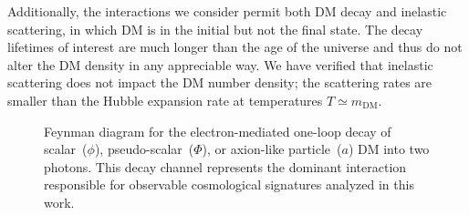 \documentclass[aps,prd,twocolumn,showpacs,superscriptaddress,nofootinbib,preprintnumbers]{revtex4-2}
\begin{document}
Additionally, the interactions we consider permit both DM decay and inelastic scattering, in which DM is in the initial but not the final state.
The decay lifetimes of interest are much longer than the age of the universe and thus do not alter the DM density in any appreciable way.
We have verified that inelastic scattering does not impact the DM number density; the scattering rates are smaller than the Hubble expansion rate at temperatures $T \simeq m_\mathrm{DM}$.

\begin{figure}[ht!]
  \centering
  \caption{Feynman diagram for the electron-mediated one-loop decay of scalar~($\phi$), pseudo-scalar~($\Phi$), or axion-like particle~($a$) DM into two photons.  This decay channel represents the dominant interaction responsible for observable cosmological signatures analyzed in this work.
  }
  \label{fig:loop_diagram}
\end{figure}
\end{document}
